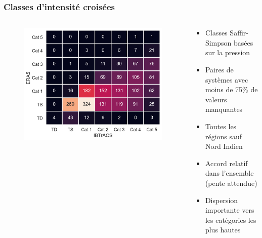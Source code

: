 \documentclass[aspectratio=169, usepdftitle=false, xcolor={dvipsnames}, 9pt,table]{beamer}
\begin{document}
\begin{frame}
    \frametitle{Classes d'intensité croisées}
    \begin{columns}
        \begin{column}{0.5\textwidth}
            \vspace{1em}
            \begin{figure}
                \centering
                \includegraphics[width=\textwidth]{Figures/crosstable_global_myVTU.png}
            \end{figure}
        \end{column}
        \begin{column}{0.5\textwidth}
            \footnotesize
            \setlength{\leftmargini}{3.5ex}
            \begin{examples}[Méthodologie]
                \begin{itemize}
                    \item Classes Saffir-Simpson basées sur la \alert{pression}\\\parencite{klotzbach_surface_2020}
                    \item Paires de systèmes avec moins de 75\% de valeurs manquantes
                    \item Toutes les régions sauf Nord Indien
                \end{itemize}    
            \end{examples}
            \vspace{2em}
            \begin{block}
               \begin{itemize}
                    \item Accord relatif dans l'ensemble (pente attendue)
                    \item \alert{Dispersion importante} vers les catégories les plus hautes
               \end{itemize} 
            \end{block}
        \end{column}
    \end{columns} 
\end{frame}
\end{document}
